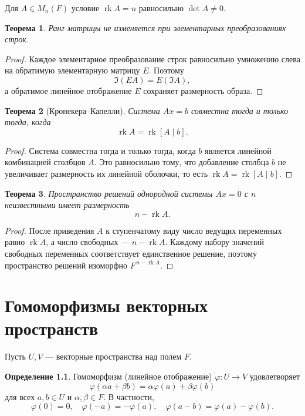 \documentclass[12pt,a4paper,oneside,openany]{book}
\theoremstyle{definition}
\newtheorem{definition}{Определение}[chapter]
\theoremstyle{plain}
\newtheorem{theorem}{Теорема}[chapter]
\theoremstyle{remark}
\DeclareMathOperator{\rk}{rk}
\begin{document}
Для $A\in M_n(F)$ условие $\rk A=n$ равносильно $\det A\ne0$.

\begin{theorem}
Ранг матрицы не изменяется при элементарных преобразованиях строк.
\end{theorem}

\begin{proof}
Каждое элементарное преобразование строк равносильно умножению слева на
обратимую элементарную матрицу $E$. Поэтому
\[
  \Im(EA)=E(\Im A),
\]
а обратимое линейное отображение $E$ сохраняет размерность образа.
\end{proof}

\begin{theorem}[Кронекера--Капелли]
Система $Ax=b$ совместна тогда и только тогда, когда
\[
  \rk A=\rk[A\mid b].
\]
\end{theorem}

\begin{proof}
Система совместна тогда и только тогда, когда $b$ является линейной
комбинацией столбцов $A$. Это равносильно тому, что добавление столбца
$b$ не увеличивает размерность их линейной оболочки, то есть
$\rk A=\rk[A\mid b]$.
\end{proof}

\begin{theorem}
Пространство решений однородной системы $Ax=0$ с $n$ неизвестными имеет
размерность
\[
  n-\rk A.
\]
\end{theorem}

\begin{proof}
После приведения $A$ к ступенчатому виду число ведущих переменных равно
$\rk A$, а число свободных --- $n-\rk A$. Каждому набору значений
свободных переменных соответствует единственное решение, поэтому
пространство решений изоморфно $F^{\,n-\rk A}$.
\end{proof}


\chapter{Гомоморфизмы векторных пространств}

Пусть $U,V$ --- векторные пространства над полем $F$.

\begin{definition}
Гомоморфизм (линейное отображение) $\varphi\colon U\to V$ удовлетворяет
\[
  \varphi(\alpha a+\beta b)
  =\alpha\varphi(a)+\beta\varphi(b)
\]
для всех $a,b\in U$ и $\alpha,\beta\in F$. В частности,
\[
  \varphi(0)=0,
  \quad \varphi(-a)=-\varphi(a),
  \quad \varphi(a-b)=\varphi(a)-\varphi(b).
\]
\end{definition}
\end{document}
